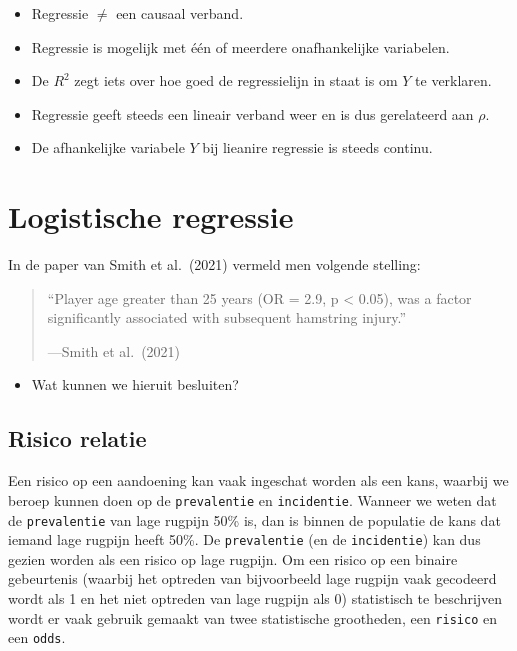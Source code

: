 \documentclass[
]{book}
\providecommand{\tightlist}{%
  \setlength{\itemsep}{0pt}\setlength{\parskip}{0pt}}
\theoremstyle{definition}
\theoremstyle{definition}
\theoremstyle{definition}
\theoremstyle{definition}
\theoremstyle{remark}
\begin{document}
\begin{itemize}
\tightlist
\item
  Regressie \(\neq\) een causaal verband.
\item
  Regressie is mogelijk met één of meerdere onafhankelijke variabelen.
\item
  De \(R^2\) zegt iets over hoe goed de regressielijn in staat is om \(Y\) te verklaren.
\item
  Regressie geeft steeds een lineair verband weer en is dus gerelateerd aan \(\rho\).
\item
  De afhankelijke variabele \(Y\) bij lieanire regressie is steeds continu.
\end{itemize}

\mainmatter

\hypertarget{logregr}{%
\chapter{Logistische regressie}\label{logregr}}

In de paper van Smith et al.~(2021) vermeld men volgende stelling:

\begin{quote}
``Player age greater than 25 years (OR = 2.9, p \textless{} 0.05), was a factor significantly associated with subsequent hamstring injury.''

---Smith et al.~(2021)
\end{quote}

\begin{itemize}
\tightlist
\item
  Wat kunnen we hieruit besluiten?
\end{itemize}

\hypertarget{risico-relatie}{%
\section*{Risico relatie}\label{risico-relatie}}


Een risico op een aandoening kan vaak ingeschat worden als een kans, waarbij we beroep kunnen doen op de \texttt{prevalentie} en \texttt{incidentie}. Wanneer we weten dat de \texttt{prevalentie} van lage rugpijn 50\% is, dan is binnen de populatie de kans dat iemand lage rugpijn heeft 50\%. De \texttt{prevalentie} (en de \texttt{incidentie}) kan dus gezien worden als een risico op lage rugpijn. Om een risico op een binaire gebeurtenis (waarbij het optreden van bijvoorbeeld lage rugpijn vaak gecodeerd wordt als 1 en het niet optreden van lage rugpijn als 0) statistisch te beschrijven wordt er vaak gebruik gemaakt van twee statistische grootheden, een \texttt{risico} en een \texttt{odds}.
\end{document}
